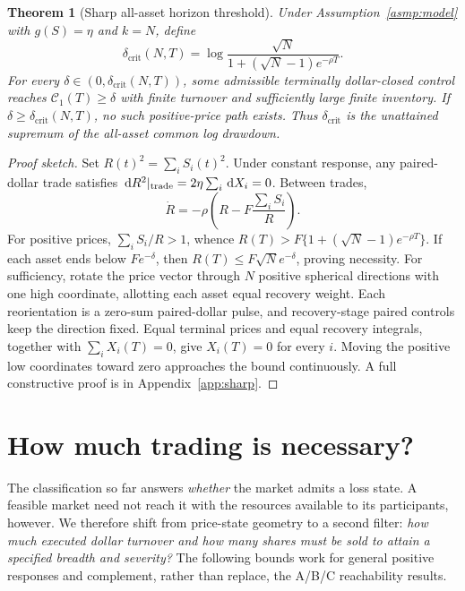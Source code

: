 \documentclass[11pt]{article}
\numberwithin{equation}{section}
\newtheorem{theorem}{Theorem}[section]
\theoremstyle{definition}
\theoremstyle{remark}
\newcommand{\Cris}{\mathcal{C}}
\newcommand{\dd}{\,\mathrm{d}}
\begin{document}
\begin{theorem}[Sharp all-asset horizon threshold]\label{thm:critical}
Under Assumption~\ref{asmp:model} with $g(S)=\eta$ and $k=N$, define
\begin{equation}\label{eq:critical}
\boxed{\delta_{\mathrm{crit}}(N,T)=
\log\frac{\sqrt N}{1+(\sqrt N-1)e^{-\rho T}}.}
\end{equation}
For every $\delta\in(0,\delta_{\mathrm{crit}}(N,T))$, some admissible terminally dollar-closed control reaches $\Cris_1(T)\ge\delta$ with finite turnover and sufficiently large finite inventory. If $\delta\ge\delta_{\mathrm{crit}}(N,T)$, no such positive-price path exists. Thus $\delta_{\mathrm{crit}}$ is the \emph{unattained supremum} of the all-asset common log drawdown.
\end{theorem}
\begin{proof}[Proof sketch]
Set $R(t)^2=\sum_iS_i(t)^2$. Under constant response, any paired-dollar trade satisfies $\dd R^2|_{\rm trade}=2\eta\sum_i\dd X_i=0$. Between trades,
\[
\dot R=-\rho\left(R-F\frac{\sum_iS_i}{R}\right).
\]
For positive prices, $\sum_iS_i/R>1$, whence $R(T)>F\{1+(\sqrt N-1)e^{-\rho T}\}$. If each asset ends below $Fe^{-\delta}$, then $R(T)\le F\sqrt Ne^{-\delta}$, proving necessity. For sufficiency, rotate the price vector through $N$ positive spherical directions with one high coordinate, allotting each asset equal recovery weight. Each reorientation is a zero-sum paired-dollar pulse, and recovery-stage paired controls keep the direction fixed. Equal terminal prices and equal recovery integrals, together with $\sum_iX_i(T)=0$, give $X_i(T)=0$ for every $i$. Moving the positive low coordinates toward zero approaches the bound continuously. A full constructive proof is in Appendix~\ref{app:sharp}.
\end{proof}


\section{How much trading is necessary?}\label{sec:budget}
The classification so far answers \emph{whether} the market admits a loss state. A feasible market need not reach it with the resources available to its participants, however. We therefore shift from price-state geometry to a second filter: \emph{how much executed dollar turnover and how many shares must be sold to attain a specified breadth and severity?} The following bounds work for general positive responses and complement, rather than replace, the A/B/C reachability results.
\end{document}
